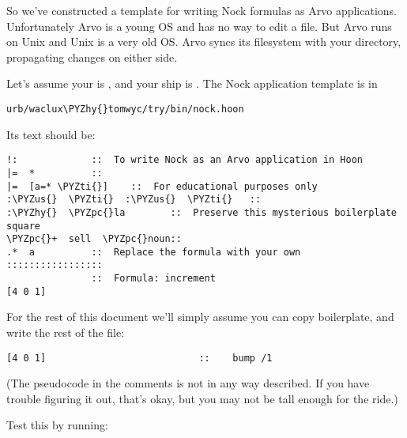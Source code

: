 So we've constructed a template for writing Nock formulas as Arvo
applications.  Unfortunately Arvo is a young OS and has no way to
edit a file.  But Arvo runs on Unix and Unix is a very old OS.
Arvo syncs its filesystem with your  directory,
propagating changes on either side.

Let's assume your  is , and your ship is
.  The Nock application template is in

\begin{framed_shaded}
\begin{Verbatim}[fontsize=\relsize{-2.5},fontseries=b,commandchars=\\\{\}]
urb/waclux\PYZhy{}tomwyc/try/bin/nock.hoon
\end{Verbatim}
\end{framed_shaded}

Its text should be:

\begin{framed_shaded}
\begin{Verbatim}[fontsize=\relsize{-2.5},fontseries=b,commandchars=\\\{\}]
!:             ::  To write Nock as an Arvo application in Hoon
|=  *          ::
|=  [a=* \PYZti{}]    ::  For educational purposes only
:\PYZus{}  \PYZti{}  :\PYZus{}  \PYZti{}   ::
:\PYZhy{}  \PYZpc{}la        ::  Preserve this mysterious boilerplate square
\PYZpc{}+  sell  \PYZpc{}noun::
.*  a          ::  Replace the formula with your own
:::::::::::::::::
               ::  Formula: increment
[4 0 1]
\end{Verbatim}
\end{framed_shaded}

For the rest of this document we'll simply assume you can copy
boilerplate, and write the rest of the file:

\begin{framed_shaded}
\begin{Verbatim}[fontsize=\relsize{-2.5},fontseries=b,commandchars=\\\{\}]
[4 0 1]                           ::    bump /1
\end{Verbatim}
\end{framed_shaded}

(The pseudocode in the comments is not in any way described.  If
you have trouble figuring it out, that's okay, but you may not be
tall enough for the ride.)

Test this by running:

